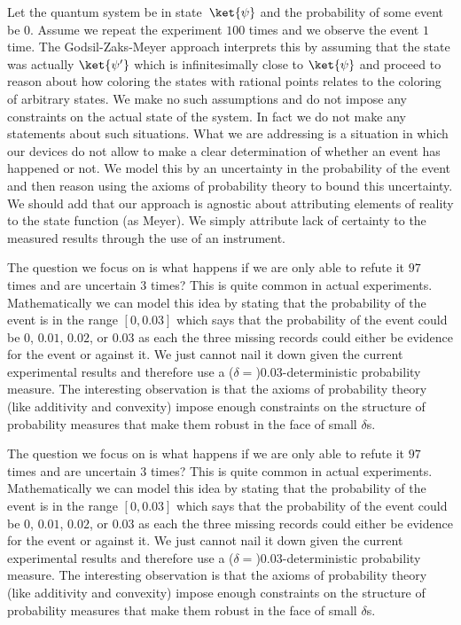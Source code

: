\documentclass[english,reprint, aps, prl,superscriptaddress, showpacs,
showkeys, longbibliography, amsmath, amssymb, floatfix]{revtex4-1}
\theoremstyle{plain}
\theoremstyle{definition}
\begin{document}
Let the quantum system be in state~$\ket{\psi}$ and the probability
of some event  be $0$. Assume we repeat the experiment $100$ times
and we observe the event $1$ time. The Godsil-Zaks-Meyer approach
interprets this by assuming that the state was actually $\ket{\psi'}$
which is infinitesimally close to $\ket{\psi}$ and proceed to reason
about how coloring the states with rational points relates to the
coloring of arbitrary states. We make no such assumptions and do not
impose any constraints on the actual state of the system. In fact
we do not make any statements about such situations. What we are addressing
is a situation in which our devices do not allow to make a clear determination
of whether an event has happened or not. We model this by an uncertainty
in the probability of the event and then reason using the axioms of
probability theory to bound this uncertainty. We should add that our
approach is agnostic about attributing elements of reality to the
state function (as Meyer). We simply attribute lack of certainty to
the measured results through the use of an instrument. 

The question we focus on is what happens if we are only able to refute
it $97$ times and are uncertain $3$ times? This is quite common
in actual experiments. Mathematically we can model this idea by stating
that the probability of the event is in the range $\left[0,0.03\right]$
which says that the probability of the event could be $0$, $0.01$,
$0.02$, or $0.03$ as each the three missing records could either
be evidence for the event or against it. We just cannot nail it down
given the current experimental results and therefore use a ($\delta=$)$0.03$-deterministic
probability measure. The interesting observation is that the axioms
of probability theory (like additivity and convexity) impose enough
constraints on the structure of probability measures that make them
robust in the face of small $\delta$s.


The question we focus on is what happens if we are only able to refute
it $97$ times and are uncertain $3$ times? This is quite common
in actual experiments. Mathematically we can model this idea by stating
that the probability of the event is in the range $\left[0,0.03\right]$
which says that the probability of the event could be $0$, $0.01$,
$0.02$, or $0.03$ as each the three missing records could either
be evidence for the event or against it. We just cannot nail it down
given the current experimental results and therefore use a ($\delta=$)$0.03$-deterministic
probability measure. The interesting observation is that the axioms
of probability theory (like additivity and convexity) impose enough
constraints on the structure of probability measures that make them
robust in the face of small $\delta$s.
\end{document}
